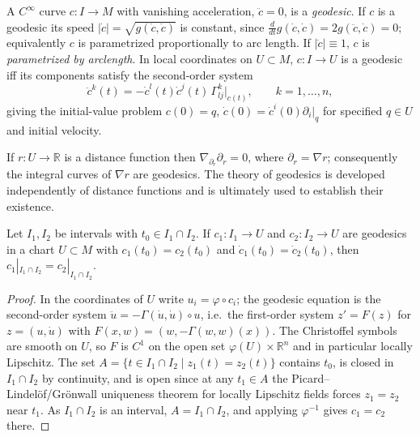 \begin{definition}
  \label{def:pet-ch5-geodesic}
  \leanok
  A $C^\infty$ curve $c:I\to M$ with vanishing acceleration, $\ddot c=0$, is a
  \emph{geodesic}. If $c$ is a geodesic its speed $|\dot c|=\sqrt{g(\dot c,\dot c)}$
  is constant, since $\frac{d}{dt}g(\dot c,\dot c)=2g(\ddot c,\dot c)=0$; equivalently
  $c$ is parametrized proportionally to arc length. If $|\dot c|\equiv1$, $c$ is
  \emph{parametrized by arclength}. In local coordinates on $U\subset M$, $c:I\to U$
  is a geodesic iff its components satisfy the second-order system
  \[
    \ddot c^k(t)=-\dot c^l(t)\dot c^j(t)\,\Gamma^k_{lj}|_{c(t)},\qquad k=1,\dots,n,
  \]
  giving the initial-value problem $c(0)=q$, $\dot c(0)=\dot c^i(0)\partial_i|_q$ for
  specified $q\in U$ and initial velocity.
\end{definition}

\begin{remark}
  \label{rem:pet-ch5-distance-function-geodesics}
  If $r:U\to\mathbb R$ is a distance function then $\nabla_{\partial_r}\partial_r=0$, where
  $\partial_r=\nabla r$; consequently the integral curves of $\nabla r$ are geodesics.
  The theory of geodesics is developed independently of distance functions and is
  ultimately used to establish their existence.
\end{remark}

\begin{theorem}
  \label{thm:pet-ch5-local-uniqueness}
  \leanok
  Let $I_1,I_2$ be intervals with $t_0\in I_1\cap I_2$. If $c_1:I_1\to U$ and
  $c_2:I_2\to U$ are geodesics in a chart $U\subset M$ with $c_1(t_0)=c_2(t_0)$ and
  $\dot c_1(t_0)=\dot c_2(t_0)$, then $c_1|_{I_1\cap I_2}=c_2|_{I_1\cap I_2}$.
\end{theorem}
\begin{proof}
  \leanok
  In the coordinates of $U$ write $u_i=\varphi\circ c_i$; the geodesic equation
  is the second-order system $\ddot u=-\Gamma(\dot u,\dot u)\circ u$, i.e.\ the
  first-order system $z'=F(z)$ for $z=(u,\dot u)$ with
  $F(x,w)=(w,-\Gamma(w,w)(x))$. The Christoffel symbols are smooth on $U$, so
  $F$ is $C^1$ on the open set $\varphi(U)\times\mathbb R^n$ and in particular
  locally Lipschitz. The set $A=\{t\in I_1\cap I_2\mid z_1(t)=z_2(t)\}$
  contains $t_0$, is closed in $I_1\cap I_2$ by continuity, and is open since
  at any $t_1\in A$ the Picard--Lindel\"of/Gr\"onwall uniqueness theorem for
  locally Lipschitz fields forces $z_1=z_2$ near $t_1$. As $I_1\cap I_2$ is an
  interval, $A=I_1\cap I_2$, and applying $\varphi^{-1}$ gives $c_1=c_2$ there.
\end{proof}

